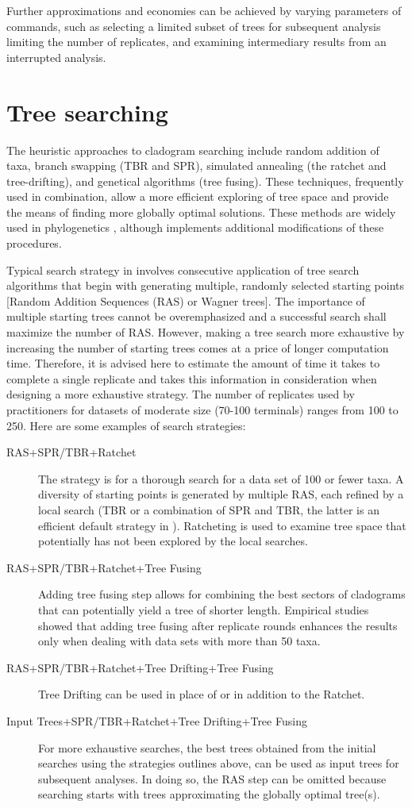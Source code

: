 Further approximations and economies can be achieved by varying parameters of commands, such as selecting a limited subset of trees for subsequent analysis limiting the number of replicates, and examining intermediary results from an interrupted analysis.

\section{Tree searching}
The heuristic approaches to cladogram searching include random addition of taxa, branch swapping (TBR and SPR), simulated annealing (the ratchet and tree-drifting), and genetical algorithms (tree fusing). These techniques, frequently used in combination, allow a more efficient exploring of tree space and provide the means of finding more globally optimal solutions. These methods are widely used in phylogenetics \cite{felsenstein2004a, wheeleretal2006}, although \poy implements additional modifications of these procedures.

Typical search strategy in \poy involves consecutive application of tree search algorithms that begin with generating multiple, randomly selected starting points [Random Addition Sequences (RAS) or Wagner trees]. The importance of multiple starting trees cannot be overemphasized and a successful search shall maximize the number of RAS. However, making a tree search more exhaustive by increasing the number of starting trees comes at a price of longer computation time. Therefore, it is advised here to estimate the amount of time it takes to complete a single replicate and takes this information in consideration when designing a more exhaustive strategy. The  number of replicates used by \poy practitioners for datasets of moderate size (70-100 terminals) ranges from 100 to 250. Here are some examples of search strategies:
\begin{description}
\item[RAS+SPR/TBR+Ratchet] The strategy is for a thorough search for a data set of 100 or fewer taxa. A diversity of starting points is generated by multiple RAS, each refined by a local search (TBR or a combination of SPR and TBR, the latter is an efficient default strategy in \poy). Ratcheting is used to examine tree space that potentially has not been explored by the local searches.
\item[RAS+SPR/TBR+Ratchet+Tree Fusing]  Adding tree fusing step allows for combining the best sectors of cladograms that can potentially yield a tree of shorter length. Empirical studies showed that adding tree fusing after replicate rounds enhances the results only when dealing with data sets with more than 50 taxa.
\item[RAS+SPR/TBR+Ratchet+Tree Drifting+Tree Fusing] Tree Drifting can be used in place of or in addition to the Ratchet.
\item[Input Trees+SPR/TBR+Ratchet+Tree Drifting+Tree Fusing] For more exhaustive searches, the best trees obtained from the initial searches using the strategies outlines above, can be used as input trees for subsequent analyses. In doing so, the RAS step can be omitted because searching starts with trees approximating the globally optimal tree(s).
\end{description}


